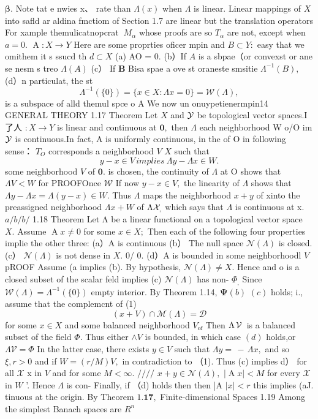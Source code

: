 ${\boldsymbol{\beta}}.$ Note tat e nwies x、 rate than $\Lambda(x)$ when $\Lambda$ is linear. Linear mappings of $X$ into safld ar aldina fmctiom of Section 1.7 are linear but the translation operators For xample themulicatnopcrat $\ M_{\alpha}$ whose proofs are so $T_{\alpha}$ are not, except when $a=0.$ $\operatorname{A}\colon X\to Y$ Here are some proprties oficer mpin and $B\subset Y\colon$ easy that we omithem it s ssucd th $d\subset X$ (a) AO = 0. (b）If $\scriptstyle A$ is a sbpae（or convexst or ane se nesm s treo $\Lambda(A)$ (c） If ${\boldsymbol{B}}$ Bisa spae a ove st oraneste smsitie $\Lambda^{-1}(B),$ (d）n particulat, the st $$ \Lambda^{-1}(\{0\})=\{x\in X\colon\Lambda x=0\}={\mathcal{W}}(\Lambda), $$ is a subspace of alld themul spce o A We now un onuypetienermpin14 GENERAL THEORY 1.17 Theorem Let $X$ and ${\cal{Y}}$ be topological vector spaces.I了人 $:X\to Y$ is linear and continuous at $\mathbf{0},$ then $\Lambda$ each neighborhood W o/O im ${\cal{Y}}$ is continuous.In fact, A is uniformly continuous, in the of O in following sense： $T_{O}$ corresponds a neighborhood ${\mathbf{}}V$ $\textstyle X$ such that $$ y-x\in V\,i m p l i e s\ \Lambda y-\Lambda x\in W. $$ some neighborhood ${\mathbf{}}V$ of ${\boldsymbol{0}}.$ is chosen, the continuity of $\Lambda$ at O shows that $\Lambda V<W$ for PROOFOnce ${\mathcal{W}}$ If now $y-x\in V,$ the linearity of $\Lambda$ shows that $\Lambda y-\Lambda x=\Lambda(y-x)\in W.$ Thus $\Lambda$ maps the neighborhood $x+y$ of xinto the preassigned neighborhood $\Lambda x+W$ of $\Lambda{\cal X}_{,}$ which says that $\Lambda$ is continuous at x. ${a\!\!\!/}{b\!\!\!/}{b\!\!\!/}$ 1.18 Theorem Let Λ be a linear functional on a topological vector space $X.$ Assume $\operatorname{A}\!x\neq0$ for some $x\in X;$ Then each of the following four properties implie the other three: (a）A is continuous (b） The null space ${\mathcal{N}}(\Lambda)$ is closed. (c） ${\mathcal{N}}(\Lambda)$ is not dense in $X.$ 0/ 0. (d）A is bounded in some neighborhoodl ${\mathbf{}}V$ pROOF Assume (a implies (b). By hypothesis, ${\mathcal{N}}(\Lambda)\neq X.$ Hence and {o} is a closed subset of the scalar feld implies (c) ${\mathcal{N}}(\Lambda)$ has non- ${\Phi}_{\!,}$ Since ${\mathcal W}(\Lambda)=\Lambda^{-1}(\{0\})$ empty interior. By Theorem 1.14, $\mathbf{\Psi}(b)$ $\left(c\right)$ holds; i., assume that the complemcnt of (1) $$ (x+V)\cap{\mathcal{M}}(\Lambda)={\mathcal{D}} $$ for some $x\in X$ and some balanced neighborhood $V_{\mathrm{of}}$ Then $\Lambda\,{\cal V}\,$ is a balanced subset of the field $\Phi.$ Thus either $\wedge V$ is bounded, in which case $(d)$ holds,or $\Lambda{\mathcal{V}}=\Phi$ In the latter case, there cxists $\scriptstyle y\in V$ such that $\Lambda y=\,-\,\Lambda x,$ and so $\xi,r>0$ and if $W=(r/M)V,$ in contradiction to （1). Thus (c) implies d） for all $\textstyle{\mathcal{X}}$ x in ${\mathbf{}}V$ and for some $M<\infty.$ ${\big/}{\big/}{\big/}{\big/}$ $x+y\in{\mathcal{N}}(\Lambda),$ $|\operatorname{A}x|<M$ for every $\textstyle{\mathcal{X}}$ in $W$ ’. Hence $\Lambda$ is con- Finally, if （d) holds then then |A $\textstyle|x|<r$ this implies (aJ. tinuous at the origin. By Theorem $1.{\boldsymbol{17}},$ Finite-dimensional Spaces 1.19 Among the simplest Banach spaces are $R^{n}$ 